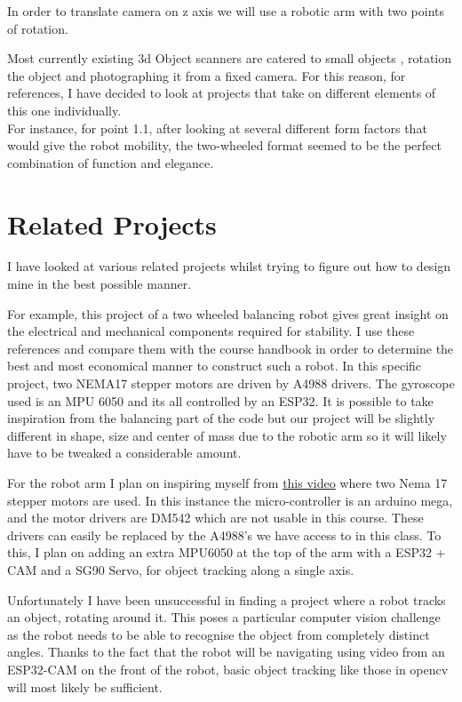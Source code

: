 \documentclass{article}
\begin{document}
In order to translate camera on z axis we will use a robotic arm with two points of rotation. 


Most currently existing 3d Object scanners are catered to small objects \cite{desktop3dscanner}, rotation the object and photographing it from a fixed camera. For this reason, for references, I have decided to look at projects that take on different elements of this one individually. \\
For instance, for point 1.1, after looking at several different form factors that would give the robot mobility, the two-wheeled format seemed to be the perfect combination of function and elegance.


\newpage
\section{Related Projects}
I have looked at various related projects whilst trying to figure out how to design mine in the best possible manner.

For example, this project \cite{balancingrobot} of a two wheeled balancing robot gives great insight on the electrical and mechanical components required for stability. I use these references and compare them with the course handbook in order to determine the best and most economical manner to construct such a robot. In this specific project, two NEMA17 stepper motors are driven by A4988 drivers. The gyroscope used is an MPU 6050 and its all controlled by an ESP32. It is possible to take inspiration from the balancing part of the code but our project will be slightly different in shape, size and center of mass due to the robotic arm so it will likely have to be tweaked a considerable amount.

For the robot arm I plan on inspiring myself from \href{https://www.youtube.com/watch?v=u4ynKC0TWL8}{this video} where two Nema 17 stepper motors are used. In this instance the micro-controller is an arduino mega, and the motor drivers are DM542 which are not usable in this course. These drivers can easily be replaced by the A4988's we have access to in this class. To this, I plan on adding an extra MPU6050 at the top of the arm with a ESP32 + CAM and a SG90 Servo, for object tracking along a single axis.

Unfortunately I have been unsuccessful in finding a project where a robot tracks an object, rotating around it. This poses a particular computer vision challenge as the robot needs to be able to recognise the object from completely distinct angles. Thanks to the fact that the robot will be navigating using video from an ESP32-CAM on the front of the robot, basic object tracking like those in opencv will most likely be sufficient.
\end{document}
